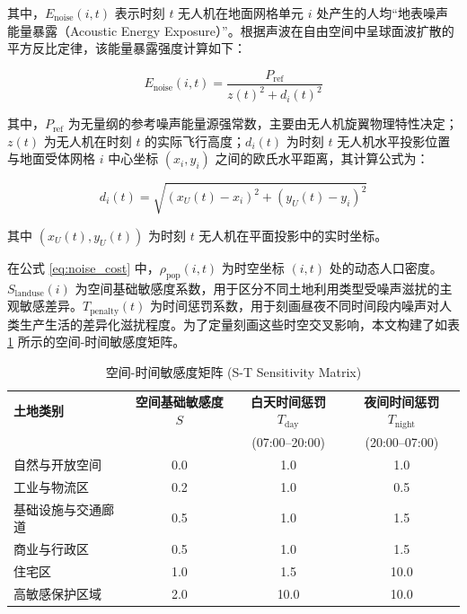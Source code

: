 其中，$E_{\mathrm{noise}}(i, t)$ 表示时刻 $t$ 无人机在地面网格单元 $i$ 处产生的人均“地表噪声能量暴露（Acoustic Energy Exposure）”。根据声波在自由空间中呈球面波扩散的平方反比定律，该能量暴露强度计算如下：

\begin{equation}
E_{\mathrm{noise}}(i, t) = \frac{P_{\mathrm{ref}}}{z(t)^2 + d_i(t)^2}
\label{eq:noise_intensity}
\end{equation}

其中，$P_{\mathrm{ref}}$ 为无量纲的参考噪声能量源强常数，主要由无人机旋翼物理特性决定；$z(t)$ 为无人机在时刻 $t$ 的实际飞行高度；$d_i(t)$ 为时刻 $t$ 无人机水平投影位置与地面受体网格 $i$ 中心坐标 $(x_i, y_i)$ 之间的欧氏水平距离，其计算公式为：

\begin{equation}
d_i(t) = \sqrt{(x_U(t) - x_i)^2 + (y_U(t) - y_i)^2}
\label{eq:horizontal_distance}
\end{equation}

其中 $(x_U(t), y_U(t))$ 为时刻 $t$ 无人机在平面投影中的实时坐标。

在公式 \eqref{eq:noise_cost} 中，$\rho_{\mathrm{pop}}(i, t)$ 为时空坐标 $(i, t)$ 处的动态人口密度。$S_{\mathrm{landuse}}(i)$ 为空间基础敏感度系数，用于区分不同土地利用类型受噪声滋扰的主观敏感差异。$T_{\mathrm{penalty}}(t)$ 为时间惩罚系数，用于刻画昼夜不同时间段内噪声对人类生产生活的差异化滋扰程度。为了定量刻画这些时空交叉影响，本文构建了如表 \ref{tab:spatiotemporal_sensitivity} 所示的空间-时间敏感度矩阵。

\begin{table}[htbp]
\centering
\caption{空间-时间敏感度矩阵 (S-T Sensitivity Matrix)}
\label{tab:spatiotemporal_sensitivity}
\renewcommand{\arraystretch}{1.3}
\begin{tabular}{l c c c}
\toprule
\textbf{土地类别} & \textbf{空间基础敏感度 $S$} & \textbf{白天时间惩罚 $T_{\mathrm{day}}$} & \textbf{夜间时间惩罚 $T_{\mathrm{night}}$} \\
                  &                              & (07:00--20:00)                & (20:00--07:00)                \\
\midrule
自然与开放空间     & 0.0                          & 1.0                           & 1.0                           \\
工业与物流区       & 0.2                          & 1.0                           & 0.5                           \\
基础设施与交通廊道 & 0.5                          & 1.0                           & 1.5                           \\
商业与行政区       & 0.5                          & 1.0                           & 1.5                           \\
住宅区             & 1.0                          & 1.5                           & 10.0                          \\
高敏感保护区域     & 2.0                          & 10.0                          & 10.0                          \\
\bottomrule
\end{tabular}
\end{table}

